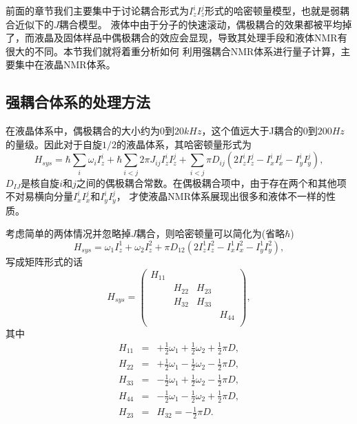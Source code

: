 前面的章节我们主要集中于讨论耦合形式为$I^i_zI^j_z$形式的哈密顿量模型，也就是弱耦合近似下的$J$耦合模型。
液体中由于分子的快速滚动，偶极耦合的效果都被平均掉了，而液晶及固体样品中偶极耦合的效应会显现，导致其处理手段和液体NMR有很大的不同。本节我们就将着重分析如何
利用强耦合NMR体系进行量子计算，主要集中在液晶NMR体系。

\subsection{强耦合体系的处理方法}

在液晶体系中，偶极耦合的大小约为$0$到$20kHz$，这个值远大于J耦合的$0$到$200Hz$的量级。因此对于自旋$1/2$的液晶体系，其哈密顿量形式为
\begin{equation}\label{aaa}
H_{sys}=\hbar\sum_{i} \omega_i I_z^i + \hbar\sum_{i<j} 2\pi J_{ij}I_z^iI_z^j + \sum_{i<j} \pi D_{ij}(2I_z^iI_z^j-I_x^iI_x^j-I_y^iI_y^j),
\end{equation}
$D_{IJ}$是核自旋$i$和$j$之间的偶极耦合常数。在偶极耦合项中，由于存在两个和其他项不对易横向分量$I_x^iI_x^j$和$I_y^iI_y^j$，
才使液晶NMR体系展现出很多和液体不一样的性质。

考虑简单的两体情况并忽略掉$J$耦合，则哈密顿量可以简化为(省略$\hbar$)
\begin{equation}\label{aaa}
H_{sys}=\omega_1 I_z^1+\omega_2 I_z^2 +  \pi D_{12}(2I_z^1I_z^2-I_x^1I_x^2-I_y^1I_y^2),
\end{equation}
写成矩阵形式的话
\begin{equation}\label{aaa}
H_{sys}=\left(
          \begin{array}{cccc}
            H_{11} &   &   &   \\
              & H_{22}   & H_{23}   &   \\
              &   H_{32} & H_{33}   &   \\
              &   &   & H_{44}   \\
          \end{array}
        \right),
\end{equation}
其中
\begin{eqnarray}\label{aaa}
H_{11}& =& +\frac{1}{2}\omega_1 +\frac{1}{2}\omega_2+\frac{1}{2}\pi D, \nonumber \\
H_{22}& =& +\frac{1}{2}\omega_1 -\frac{1}{2}\omega_2-\frac{1}{2}\pi D, \nonumber \\
H_{33}& =& -\frac{1}{2}\omega_1 +\frac{1}{2}\omega_2-\frac{1}{2}\pi D, \nonumber \\
H_{44}& =& -\frac{1}{2}\omega_1 -\frac{1}{2}\omega_2+\frac{1}{2}\pi D, \nonumber \\
H_{23}& =& H_{32}  =-\frac{1}{2}\pi D.
\end{eqnarray}

